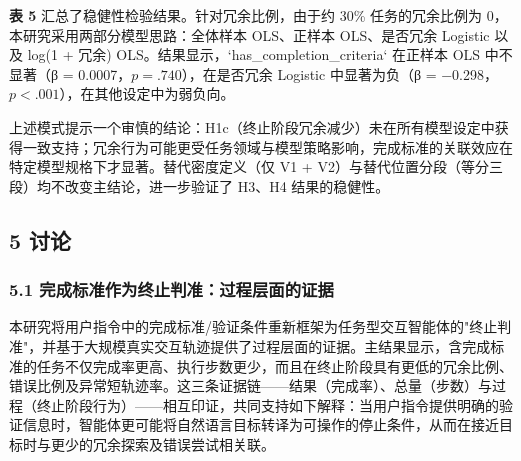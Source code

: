 \documentclass[12pt,a4paper,openany,oneside]{ctexrep}
\begin{document}
\textbf{表 5} 汇总了稳健性检验结果。针对冗余比例，由于约 30\% 任务的冗余比例为 0，本研究采用两部分模型思路：全体样本 OLS、正样本 OLS、是否冗余 Logistic 以及 log(1 + 冗余) OLS。结果显示，`has\_completion\_criteria` 在正样本 OLS 中不显著（β = 0.0007，$p=.740$），在是否冗余 Logistic 中显著为负（β = −0.298，$p<.001$），在其他设定中为弱负向。

上述模式提示一个审慎的结论：H1c（终止阶段冗余减少）未在所有模型设定中获得一致支持；冗余行为可能更受任务领域与模型策略影响，完成标准的关联效应在特定模型规格下才显著。替代密度定义（仅 V1 + V2）与替代位置分段（等分三段）均不改变主结论，进一步验证了 H3、H4 结果的稳健性。


\begin{table}[htbp]
\centering
\caption{表 5：稳健性检验：冗余比例、替代密度与替代位置定义}
\small
{}
\end{table}

\subsection{5 讨论}


\subsubsection{5.1 完成标准作为终止判准：过程层面的证据}


本研究将用户指令中的完成标准/验证条件重新框架为任务型交互智能体的"终止判准"，并基于大规模真实交互轨迹提供了过程层面的证据。主结果显示，含完成标准的任务不仅完成率更高、执行步数更少，而且在终止阶段具有更低的冗余比例、错误比例及异常短轨迹率。这三条证据链——结果（完成率）、总量（步数）与过程（终止阶段行为）——相互印证，共同支持如下解释：当用户指令提供明确的验证信息时，智能体更可能将自然语言目标转译为可操作的停止条件，从而在接近目标时与更少的冗余探索及错误尝试相关联。
\end{document}
